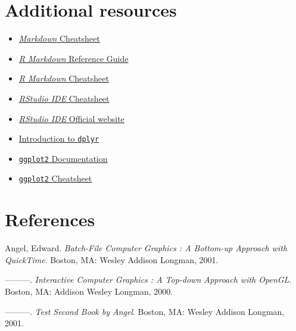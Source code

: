 \documentclass{article}
\newenvironment{CSLReferences}[2]
  {}
  {\par}
\providecommand{\tightlist}{\setlength{\itemsep}{0pt}\setlength{\parskip}{0pt}}
\begin{document}
\hypertarget{additional-resources}{%
\section{Additional resources}\label{additional-resources}}

\begin{itemize}
\tightlist
\item
  \href{https://github.com/adam-p/markdown-here/wiki/Markdown-Cheatsheet}{\emph{Markdown}
  Cheatsheet}
\item
  \href{https://www.rstudio.com/wp-content/uploads/2015/03/rmarkdown-reference.pdf}{\emph{R
  Markdown} Reference Guide}
\item
  \href{https://github.com/rstudio/cheatsheets/raw/master/rmarkdown-2.0.pdf}{\emph{R
  Markdown} Cheatsheet}
\item
  \href{https://github.com/rstudio/cheatsheets/raw/master/rstudio-ide.pdf}{\emph{RStudio
  IDE} Cheatsheet}
\item
  \href{https://rstudio.com/products/rstudio/}{\emph{RStudio IDE}
  Official website}
\item
  \href{https://cran.rstudio.com/web/packages/dplyr/vignettes/dplyr.html}{Introduction
  to \texttt{dplyr}}
\item
  \href{https://ggplot2.tidyverse.org/}{\texttt{ggplot2} Documentation}
\item
  \href{https://github.com/rstudio/cheatsheets/raw/master/data-visualization-2.1.pdf}{\texttt{ggplot2}
  Cheatsheet}
\end{itemize}

\hypertarget{references}{%
\section*{References}\label{references}}


\noindent

\hypertarget{refs}{}
\begin{CSLReferences}{1}{0}
\leavevmode\hypertarget{ref-angel2001}{}%
Angel, Edward. \emph{Batch-File Computer Graphics : A Bottom-up Approach
with QuickTime}. Boston, MA: Wesley Addison Longman, 2001.

\leavevmode\hypertarget{ref-angel2000}{}%
---------. \emph{Interactive Computer Graphics : A Top-down Approach
with OpenGL}. Boston, MA: Addison Wesley Longman, 2000.

\leavevmode\hypertarget{ref-angel2002a}{}%
---------. \emph{Test Second Book by Angel}. Boston, MA: Wesley Addison
Longman, 2001.

\end{CSLReferences}

\end{document}
